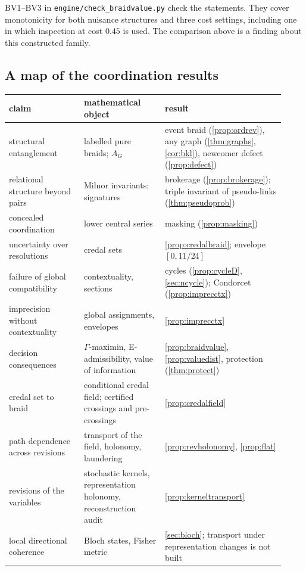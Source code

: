 \documentclass[11pt]{article}
\theoremstyle{definition}\newtheorem{definition}[theorem]{Definition}\newtheorem{remark}[theorem]{Remark}\newtheorem{example}[theorem]{Example}\newtheorem{problem}[theorem]{Open problem}\crefname{problem}{Problem}{Problems}
\begin{document}
BV1--BV3 in \texttt{engine/check\_braidvalue.py} check the statements. They cover monotonicity for both nuisance structures and three cost settings, including one in which inspection at cost $0.45$ is used. The comparison above is a finding about this constructed family.

\subsection{A map of the coordination results}\label{sec:map}
\begin{center}
\small
\begin{tabular}{>{\raggedright\arraybackslash}p{0.25\linewidth}>{\raggedright\arraybackslash}p{0.27\linewidth}>{\raggedright\arraybackslash}p{0.40\linewidth}}
claim & mathematical object & result \\ \hline
structural entanglement & labelled pure braids; $A_G$ & event braid (\cref{prop:ordrev}), any graph (\cref{thm:graphs}, \cref{cor:bkl}), newcomer defect (\cref{prop:defect}) \\
relational structure beyond pairs & Milnor invariants; signatures & brokerage (\cref{prop:brokerage}); triple invariant of pseudo-links (\cref{thm:pseudoprob}) \\
concealed coordination & lower central series & masking (\cref{prop:masking}) \\
uncertainty over resolutions & credal sets & \cref{prop:credalbraid}; envelope $[0,11/24]$ \\
failure of global compatibility & contextuality, sections & cycles (\cref{prop:cycleD}, \cref{sec:ncycle}); Condorcet (\cref{prop:imprecctx}) \\
imprecision without contextuality & global assignments, envelopes & \cref{prop:imprecctx} \\
decision consequences & $\Gamma$-maximin, E-admissibility, value of information & \cref{prop:braidvalue}, \cref{prop:valuedist}, protection (\cref{thm:protect}) \\
credal set to braid & conditional credal field; certified crossings and pre-crossings & \cref{prop:credalfield} \\
path dependence across revisions & transport of the field, holonomy, laundering & \cref{prop:revholonomy}, \cref{prop:flat} \\
revisions of the variables & stochastic kernels, representation holonomy, reconstruction audit & \cref{prop:kerneltransport} \\
local directional coherence & Bloch states, Fisher metric & \cref{sec:bloch}; transport under representation changes is not built \\
\end{tabular}
\end{center}
\end{document}
